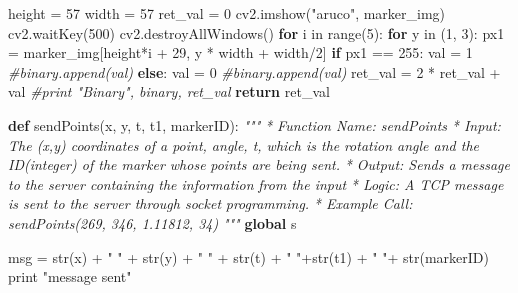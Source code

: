 \documentclass[]{article}
\newenvironment{Shaded}{}{}
\newcommand{\KeywordTok}[1]{\textcolor[rgb]{0.00,0.44,0.13}{\textbf{{#1}}}}
\newcommand{\DecValTok}[1]{\textcolor[rgb]{0.25,0.63,0.44}{{#1}}}
\newcommand{\StringTok}[1]{\textcolor[rgb]{0.25,0.44,0.63}{{#1}}}
\newcommand{\CommentTok}[1]{\textcolor[rgb]{0.38,0.63,0.69}{\textit{{#1}}}}
\newcommand{\ControlFlowTok}[1]{\textcolor[rgb]{0.00,0.44,0.13}{\textbf{{#1}}}}
\newcommand{\OperatorTok}[1]{\textcolor[rgb]{0.40,0.40,0.40}{{#1}}}
\newcommand{\BuiltInTok}[1]{{#1}}
\newcommand{\NormalTok}[1]{{#1}}
\begin{document}
\begin{Shaded}
\begin{Highlighting}[]
    \NormalTok{height }\OperatorTok{=} \DecValTok{57}
    \NormalTok{width }\OperatorTok{=} \DecValTok{57}
    \NormalTok{ret_val }\OperatorTok{=} \DecValTok{0}
    \NormalTok{cv2.imshow(}\StringTok{"aruco"}\NormalTok{, marker_img)}
    \NormalTok{cv2.waitKey(}\DecValTok{500}\NormalTok{)}
    \NormalTok{cv2.destroyAllWindows()}
    \ControlFlowTok{for} \NormalTok{i }\OperatorTok{in} \BuiltInTok{range}\NormalTok{(}\DecValTok{5}\NormalTok{):}
        \ControlFlowTok{for} \NormalTok{y }\OperatorTok{in} \NormalTok{(}\DecValTok{1}\NormalTok{, }\DecValTok{3}\NormalTok{):}
            \NormalTok{px1 }\OperatorTok{=} \NormalTok{marker_img[height}\OperatorTok{*}\NormalTok{i }\OperatorTok{+} \DecValTok{29}\NormalTok{, y }\OperatorTok{*} \NormalTok{width }\OperatorTok{+} \NormalTok{width}\OperatorTok{/}\DecValTok{2}\NormalTok{]}
            \ControlFlowTok{if} \NormalTok{px1 }\OperatorTok{==} \DecValTok{255}\NormalTok{:}
                \NormalTok{val }\OperatorTok{=} \DecValTok{1}
                \CommentTok{#binary.append(val)}
            \ControlFlowTok{else}\NormalTok{:}
                \NormalTok{val }\OperatorTok{=} \DecValTok{0}
                \CommentTok{#binary.append(val)}
            \NormalTok{ret_val }\OperatorTok{=} \DecValTok{2} \OperatorTok{*} \NormalTok{ret_val }\OperatorTok{+} \NormalTok{val}
    \CommentTok{#print "Binary", binary, ret_val}
    \ControlFlowTok{return} \NormalTok{ret_val}


\KeywordTok{def} \NormalTok{sendPoints(x, y, t, t1, markerID):}
    \CommentTok{"""}
\CommentTok{    * Function Name:    sendPoints}
\CommentTok{    * Input:        The (x,y) coordinates of a point, angle, t, which is the}
\CommentTok{                        rotation angle and the ID(integer) of the marker whose}
\CommentTok{                        points are being sent.}
\CommentTok{    * Output:       Sends a message to the server containing the information}
\CommentTok{                        from the input}
\CommentTok{    * Logic:        A TCP message is sent to the server through socket}
\CommentTok{                        programming.}
\CommentTok{    * Example Call: sendPoints(269, 346, 1.11812, 34)}
\CommentTok{    """}
    \KeywordTok{global} \NormalTok{s}

    
    \NormalTok{msg }\OperatorTok{=} \BuiltInTok{str}\NormalTok{(x) }\OperatorTok{+} \StringTok{" "} \OperatorTok{+} \BuiltInTok{str}\NormalTok{(y) }\OperatorTok{+} \StringTok{" "} \OperatorTok{+} \BuiltInTok{str}\NormalTok{(t) }\OperatorTok{+} \StringTok{" "}\OperatorTok{+}\BuiltInTok{str}\NormalTok{(t1) }\OperatorTok{+} \StringTok{" "}\OperatorTok{+} \BuiltInTok{str}\NormalTok{(markerID)}
    \BuiltInTok{print} \StringTok{"message sent"}
        


\end{Highlighting}
\end{Shaded}
\end{document}
